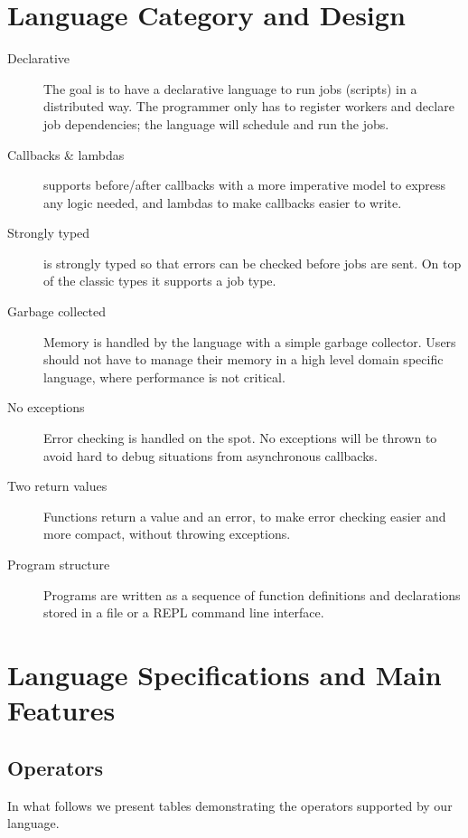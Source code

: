 \section{Language Category and Design}
\label{sect:desg}
\begin{description}
\item[Declarative] The goal is to have a declarative language to run jobs
(scripts) in a distributed way. The programmer only has to register workers and
declare job dependencies; the language will schedule and run the jobs.
\item[Callbacks \& lambdas] \lang{} supports before/after callbacks
with a more imperative model to express any logic needed, and
lambdas to make callbacks easier to write.
\item[Strongly typed] \lang{} is strongly typed so that errors can be checked
before jobs are sent. On top of the classic types it supports a job type.
\item[Garbage collected] Memory is handled by the language with a simple
garbage collector. Users should not have to manage their memory in a high
level domain specific language, where performance is not critical.
\item[No exceptions] Error checking is handled on the spot. No exceptions
will be thrown to avoid hard to debug situations from asynchronous callbacks.
\item[Two return values] Functions return a value and an error, to make error
checking easier and more compact, without throwing exceptions.
\item[Program structure] Programs are written as a sequence of function
definitions and declarations stored in a file or a REPL command line
interface.
\end{description}

\section{Language Specifications and Main Features}
\label{sect:spec}

\subsection*{Operators}
In what follows we present tables demonstrating the operators supported by our
language.%


